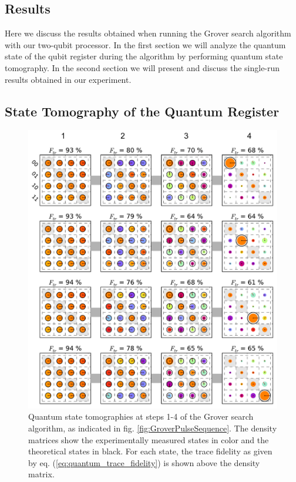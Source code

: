 \subsection{Results}

Here we discuss the results obtained when running the Grover search algorithm with our two-qubit processor. In the first section we will analyze the quantum state of the qubit register during the algorithm by performing quantum state tomography. In the second section we will present and discuss the single-run results obtained in our experiment.

\subsection{State Tomography of the Quantum Register}

\begin{figure}[ht!]
	\centering
		\includegraphics[width=1.\textwidth]{"./data/ct5/2011_04_21 - grover and tomo/good_data/grover algorithm - summary"}
	\caption[Quantum state tomographies at different steps during the Grover search algorithm and single-run outcome probabilities]{Quantum state tomographies at steps 1-4 of the Grover search algorithm, as indicated in fig. \ref{fig:GroverPulseSequence}. The density matrices show the experimentally measured states in color and the theoretical states in black. For each state, the trace fidelity as given by eq. (\ref{eq:quantum_trace_fidelity}) is shown above the density matrix.}
	\label{fig:GroverAlgorithmExperimentalResults}
\end{figure}

